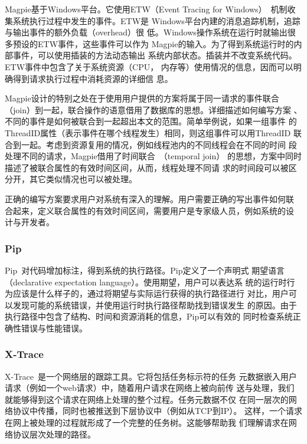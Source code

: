 Magpie基于Windows平台。它使用ETW（Event Tracing for
Windows）~\cite{etw, Park2003}机制收集系统执行过程中发生的事件。ETW是
Windows平台内建的消息追踪机制，追踪与输出事件的额外负载（overhead）很
低。Windows操作系统在运行时就输出很多预设的ETW事件，这些事件可以作为
Magpie的输入。为了得到系统运行时的内部事件，可以使用插装的方法动态输出
系统内部状态。插装并不改变系统代码。ETW事件中包含了关于系统资源（CPU，
内存等）使用情况的信息，因而可以明确得到请求执行过程中消耗资源的详细信
息。

Magpie设计的特别之处在于使用用户提供的方案将属于同一请求的事件联合
（join）到一起，联合操作的语意借用了数据库的思想。详细描述如何编写方案
、不同的事件是如何被联合到一起超出本文的范围。简单举例说，如果一组事件
的ThreadID属性（表示事件在哪个线程发生）相同，则这组事件可以用ThreadID
联合到一起。考虑到资源复用的情况，例如线程池内的不同线程会在不同的时间
段处理不同的请求，Magpie借用了时间联合~\cite{Gao2005}（temporal join）
的思想，方案中同时描述了被联合属性的有效时间区间，从而，线程处理不同请
求的时间段可以被区分开，其它类似情况也可以被处理。

正确的编写方案要求用户对系统有深入的理解。用户需要正确的写出事件如何联
合起来，定义联合属性的有效时间区间，需要用户是专家级人员，例如系统的设
计与开发者。

\subsubsection*{Pip}

Pip~\cite{pip}对代码增加标注，得到系统的执行路径。Pip定义了一个声明式
期望语言（declarative expectation language）。使用期望，用户可以表达系
统的运行时行为应该是什么样子的，通过将期望与实际运行获得的执行路径进行
对比，用户可以发现可能的系统错误，并使用运行时执行路径帮助找到错误发生
的原因。由于执行路径中包含了结构、时间和资源消耗的信息，Pip可以有效的
同时检查系统正确性错误与性能错误。


\subsubsection*{X-Trace}

X-Trace~\cite{x-trace}是一个网络层的跟踪工具。它将包括任务标示符的任务
元数据嵌入用户请求（例如一个web请求）中，随着用户请求在网络上被向前传
送与处理，我们就能够得到这个请求在网络上处理的整个过程。任务元数据不仅
在同一层次的网络协议中传播，同时也被推送到下层协议中（例如从TCP到IP）。
这样，一个请求在网上被处理的过程就形成了一个完整的任务树。这能够帮助我
们理解请求在网络协议层次处理的路径。

